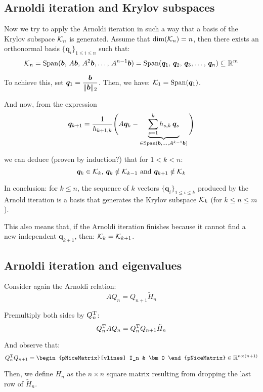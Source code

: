 \documentclass[
  12pt,
  paper=a4,
]{scrartcl} %
\begin{document}
\subsection*{Arnoldi iteration and Krylov subspaces}

Now we try to apply the Arnoldi iteration in such a way that a basis of the Krylov subspace $\mathcal{K}_n$ is generated. Assume that $\dim(\mathcal{K}_n)=n$, then there exists an orthonormal basis $\{\bm q_i\}_{1\le i \le n}$ such that:
\[
    \mathcal{K}_n
        = \operatorname{Span}(\bm b,\, A\bm b,\, A^2\bm b, \dots ,\, A^{n-1} \bm b)
        = \operatorname{Span}(\bm q_1,\,\bm q_2,\,\bm q_3, \dots ,\,\bm q_n)
    \subseteq \mathbb R^m
\]

To achieve this, set $\displaystyle\bm q_1 = \frac{\bm b}{\|\bm b\|_2}$. Then, we have: $\mathcal{K}_1 = \operatorname{Span}(\bm q_1)$.

And now, from the expression
\[    \bm q_{k+1} = \frac{1}{h_{k+1,k}}
    \Bigg(
        A\bm q_k - 
            \underbrace{
                \sum_{s=1}^{k} h_{s,k}\,\bm q_s
            }_{\in \operatorname{Span}(\bm b, ..., A^{k-1}\bm b)}
    \Bigg)
\]

we can deduce (proven by induction?) that for $1<k<n$:
\[\text{$\bm q_{k}\in \mathcal{K}_k$, $\bm q_{k}\notin \mathcal{K}_{k-1}$ and $\bm q_{k+1}\notin \mathcal{K}_{k}$}\]

In conclusion: for $k \le n$, the sequence of $k$ vectors $\{\bm q_i\}_{1\le i\le k}$ produced by the Arnold iteration is a basis that generates the Krylov subspace $\mathcal{K}_k$ (for $k\le n\le m$).

This also means that, if the Arnoldi iteration finishes because it cannot find a new independent $\bm q_{k+1}$, then: $\mathcal{K}_k = \mathcal{K}_{k+1}$.

\subsection*{Arnoldi iteration and eigenvalues}

Consider again the Arnoldi relation:
\[
    AQ_n = Q_{n+1} \tilde H_{n}
\]

Premultiply both sides by $Q_n^{\mathrm{T}}$:
\[
    Q_n^{\mathrm{T}} AQ_n = Q_n^{\mathrm{T}} Q_{n+1} \tilde H_{n}
\]

And observe that:
\[
    Q_n\transp Q_{n+1} =
    \begin{pNiceMatrix}[vlines]
        I_n & \bm 0
    \end{pNiceMatrix} \in \RR^{n\times (n+1)}
\]

Then, we define $H_n$ as the $n\times n$ square matrix resulting from dropping the last row of $\tilde H_{n}$.
\end{document}
